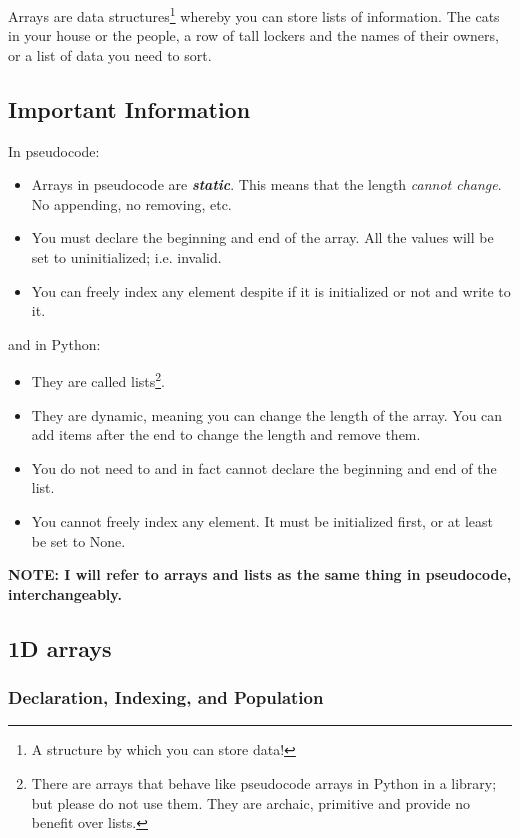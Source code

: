 \documentclass[./main.tex]{subfiles}
\begin{document}
Arrays are data structures\footnote{A structure by which you can store data!} whereby you can store lists of information. The cats in your house or the people, a row of tall lockers and the names of their owners, or a list of data you need to sort.

\subsection{Important Information}

In pseudocode:

\begin{itemize}
    \item Arrays in pseudocode are \textbf{\emph{static}}. This means that the length \emph{cannot change}. No appending, no removing, etc.
    \item You must declare the beginning and end of the array. All the values will be set to uninitialized; i.e. invalid.
    \item You can freely index any element despite if it is initialized or not and write to it.
\end{itemize}

and in Python:

\begin{itemize}
    \item They are called lists\footnote{There are arrays that behave like pseudocode arrays in Python in a library; but please do not use them. They are archaic, primitive and provide no benefit over lists.}.
    \item They are dynamic, meaning you can change the length of the array. You can add items after the end to change the length and remove them.
    \item You do not need to and in fact cannot declare the beginning and end of the list.
    \item You cannot freely index any element. It must be initialized first, or at least be set to {\ccmono None}.
\end{itemize}

\textbf{NOTE: I will refer to arrays and lists as the same thing in pseudocode, interchangeably.}

\subsection{1D arrays}

\subsubsection{Declaration, Indexing, and Population}
\end{document}
